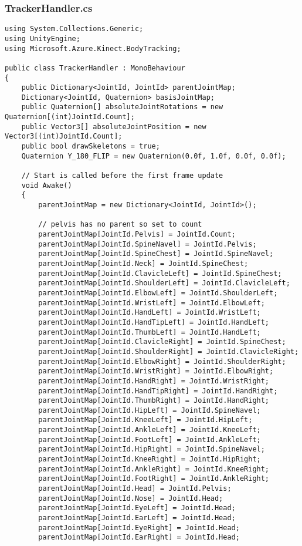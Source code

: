 \subsubsection*{TrackerHandler.cs}
\begin{verbatim}
﻿using System.Collections.Generic;
using UnityEngine;
using Microsoft.Azure.Kinect.BodyTracking;

public class TrackerHandler : MonoBehaviour
{
    public Dictionary<JointId, JointId> parentJointMap;
    Dictionary<JointId, Quaternion> basisJointMap;
    public Quaternion[] absoluteJointRotations = new Quaternion[(int)JointId.Count];
    public Vector3[] absoluteJointPosition = new Vector3[(int)JointId.Count];
    public bool drawSkeletons = true;
    Quaternion Y_180_FLIP = new Quaternion(0.0f, 1.0f, 0.0f, 0.0f);

    // Start is called before the first frame update
    void Awake()
    {
        parentJointMap = new Dictionary<JointId, JointId>();

        // pelvis has no parent so set to count
        parentJointMap[JointId.Pelvis] = JointId.Count;
        parentJointMap[JointId.SpineNavel] = JointId.Pelvis;
        parentJointMap[JointId.SpineChest] = JointId.SpineNavel;
        parentJointMap[JointId.Neck] = JointId.SpineChest;
        parentJointMap[JointId.ClavicleLeft] = JointId.SpineChest;
        parentJointMap[JointId.ShoulderLeft] = JointId.ClavicleLeft;
        parentJointMap[JointId.ElbowLeft] = JointId.ShoulderLeft;
        parentJointMap[JointId.WristLeft] = JointId.ElbowLeft;
        parentJointMap[JointId.HandLeft] = JointId.WristLeft;
        parentJointMap[JointId.HandTipLeft] = JointId.HandLeft;
        parentJointMap[JointId.ThumbLeft] = JointId.HandLeft;
        parentJointMap[JointId.ClavicleRight] = JointId.SpineChest;
        parentJointMap[JointId.ShoulderRight] = JointId.ClavicleRight;
        parentJointMap[JointId.ElbowRight] = JointId.ShoulderRight;
        parentJointMap[JointId.WristRight] = JointId.ElbowRight;
        parentJointMap[JointId.HandRight] = JointId.WristRight;
        parentJointMap[JointId.HandTipRight] = JointId.HandRight;
        parentJointMap[JointId.ThumbRight] = JointId.HandRight;
        parentJointMap[JointId.HipLeft] = JointId.SpineNavel;
        parentJointMap[JointId.KneeLeft] = JointId.HipLeft;
        parentJointMap[JointId.AnkleLeft] = JointId.KneeLeft;
        parentJointMap[JointId.FootLeft] = JointId.AnkleLeft;
        parentJointMap[JointId.HipRight] = JointId.SpineNavel;
        parentJointMap[JointId.KneeRight] = JointId.HipRight;
        parentJointMap[JointId.AnkleRight] = JointId.KneeRight;
        parentJointMap[JointId.FootRight] = JointId.AnkleRight;
        parentJointMap[JointId.Head] = JointId.Pelvis;
        parentJointMap[JointId.Nose] = JointId.Head;
        parentJointMap[JointId.EyeLeft] = JointId.Head;
        parentJointMap[JointId.EarLeft] = JointId.Head;
        parentJointMap[JointId.EyeRight] = JointId.Head;
        parentJointMap[JointId.EarRight] = JointId.Head;


\end{verbatim}
